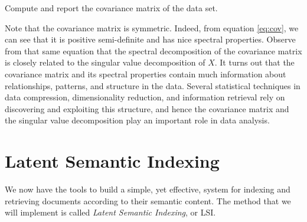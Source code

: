 \begin{problem}
Compute and report the covariance matrix of the  data set. 
\end{problem}

Note that the covariance matrix is symmetric. 
Indeed, from equation \ref{eq:cov}, we can see that it is positive semi-definite and has nice spectral properties.
Observe from that same equation that the spectral decomposition of the covariance matrix is closely related to the singular value decomposition of $X$.
It turns out that the covariance matrix and its spectral properties contain much information about relationships, patterns, and structure in the data. 
Several statistical techniques in data compression, dimensionality reduction, and information retrieval rely on discovering and exploiting this structure,
and hence the covariance matrix and the singular value decomposition play an important role in data analysis. 

\section*{Latent Semantic Indexing}
We now have the tools to build a simple, yet effective, system for indexing and retrieving documents according to their semantic content.
The method that we will implement is called \emph{Latent Semantic Indexing}, or LSI.

